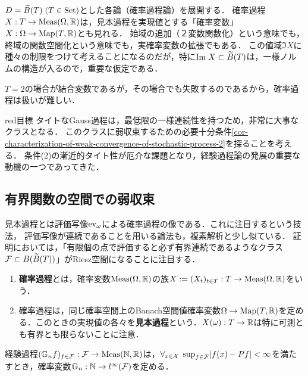 \documentclass[uplatex,dvipdfmx]{jsreport}
\begin{document}
\begin{tcolorbox}[colframe=ForestGreen, colback=ForestGreen!10!white,breakable,colbacktitle=ForestGreen!40!white,coltitle=black,fonttitle=\bfseries\sffamily,
    title=動機付け]
    $D=\widetilde{B}(T)\;(T\in\mathrm{Set})$とした各論（確率過程論）を展開する．
    確率過程$X:T\to\mathrm{Meas}(\Omega,\mathbb{R})$は，見本過程を実現値とする「確率変数」$X:\Omega\to\mathrm{Map}(T,\mathbb{R})$とも見れる．
    始域の追加（２変数関数化）という意味でも，終域の関数空間化という意味でも，実確率変数の拡張でもある．
    この値域$\Im X$に種々の制限をつけて考えることになるのだが，特に$\mathrm{Im}\; X\subset\widetilde{B}(T)$は，一様ノルムの構造が入るので，重要な仮定である．

    $T=2$の場合が結合変数であるが，その場合でも失敗するのであるから，確率過程は扱いが難しい．
\end{tcolorbox}

\begin{tbox}{red}{目標}
    タイトなGauss過程は，最低限の一様連続性を持つため，非常に大事なクラスとなる．
    このクラスに弱収束するための必要十分条件\ref{cor-characterization-of-weak-convergence-of-stochastic-process-2}を探ることを考える．
    条件(2)の漸近的タイト性が厄介な課題となり，経験過程論の発展の重要な動機の一つであってきた．
\end{tbox}

\subsection{有界関数の空間での弱収束}

\begin{tcolorbox}[colframe=ForestGreen, colback=ForestGreen!10!white,breakable,colbacktitle=ForestGreen!40!white,coltitle=black,fonttitle=\bfseries\sffamily,
title=]
    見本過程とは評価写像$\mathrm{ev}_\omega$による確率過程の像である．これに注目するという技法，
    評価写像が連続であることを用いる論法も，複素解析と少し似ている．
    証明においては，「有限個の点で評価すると必ず有界連続であるようなクラス$\mathcal{F}\subset B(\widetilde{B}(T))$」がRiesz空間になることに注目する．
\end{tcolorbox}

\begin{definition}\mbox{}
    \begin{enumerate}
        \item \textbf{確率過程}とは，確率変数$\mathrm{Meas}(\Omega,\mathbb{R})$の族$X:=(X_t)_{t\in T}:T\to\mathrm{Meas}(\Omega,\mathbb{R})$をいう．
        \item 確率過程は，同じ確率空間上のBanach空間値確率変数$\Omega\to\mathrm{Map}(T,\mathbb{R})$を定める．このときの実現値の各々を\textbf{見本過程}という．$X(\omega):T\to\mathbb{R}$は特に可測とも有界とも限らないことに注意．
    \end{enumerate}
\end{definition}
\begin{example}
    経験過程$(\mathbb{G}_nf)_{f\in\mathcal{F}}:\mathcal{F}\to\mathrm{Meas}(\mathbb{N},\mathbb{R})$は，$\forall_{x\in\mathcal{X}}\;\sup_{f\in\mathcal{F}}\lvert f(x)-Pf\rvert<\infty$を満たすとき，確率変数$\mathbb{G}_n:\mathbb{N}\to l^\infty(\mathcal{F})$を定める．
\end{example}
\end{document}
